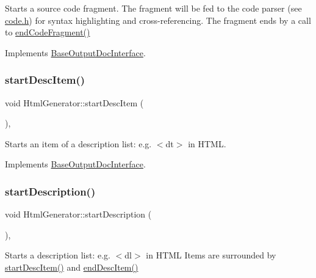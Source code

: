 Starts a source code fragment. The fragment will be fed to the code parser (see \mbox{\hyperlink{code_8h_source}{code.\+h}}) for syntax highlighting and cross-\/referencing. The fragment ends by a call to \mbox{\hyperlink{class_html_generator_a6df6ede2137490c79228b9825df3b263}{end\+Code\+Fragment()}} 

Implements \mbox{\hyperlink{class_base_output_doc_interface_ab19fc767b08c25b0ca7c976d24799bda}{Base\+Output\+Doc\+Interface}}.

\mbox{\label{class_html_generator_a7a4d4ef015bc9d8298a6c023f85737c5}} 
\subsubsection{\texorpdfstring{startDescItem()}{startDescItem()}}
{\footnotesize\ttfamily void Html\+Generator\+::start\+Desc\+Item (\begin{DoxyParamCaption}{ }\end{DoxyParamCaption})\hspace{0.3cm}{\ttfamily [inline]}, {\ttfamily [virtual]}}

Starts an item of a description list\+: e.\+g. {\ttfamily $<$dt$>$} in H\+T\+ML. 

Implements \mbox{\hyperlink{class_base_output_doc_interface_a5d1cc59d94c3f529c90e0a06704be181}{Base\+Output\+Doc\+Interface}}.

\mbox{\label{class_html_generator_a8ae03ee5e64d705aeebbe605d3c05b0f}} 
\subsubsection{\texorpdfstring{startDescription()}{startDescription()}}
{\footnotesize\ttfamily void Html\+Generator\+::start\+Description (\begin{DoxyParamCaption}{ }\end{DoxyParamCaption})\hspace{0.3cm}{\ttfamily [inline]}, {\ttfamily [virtual]}}

Starts a description list\+: e.\+g. {\ttfamily $<$dl$>$} in H\+T\+ML Items are surrounded by \mbox{\hyperlink{class_html_generator_a7a4d4ef015bc9d8298a6c023f85737c5}{start\+Desc\+Item()}} and \mbox{\hyperlink{class_html_generator_a0354681e6d39ae7da41d33f88656e335}{end\+Desc\+Item()}} 

